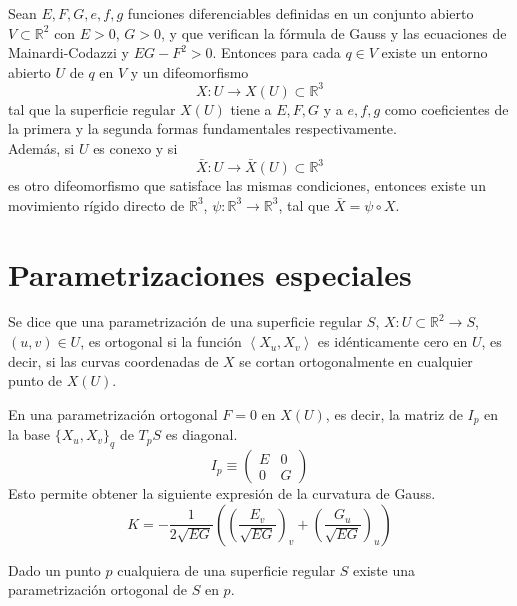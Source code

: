 \begin{theorem}
    Sean $E, F, G, e, f, g$ funciones diferenciables definidas en un conjunto abierto $V \subset \mathbb{R}^2$ con $E > 0$, $G > 0$, y que verifican la fórmula de Gauss y las ecuaciones de Mainardi-Codazzi y $EG-F^2 > 0$.
    Entonces para cada $q \in V$ existe un entorno abierto $U$ de $q$ en $V$ y un difeomorfismo
    $$X: U \to X(U) \subset \mathbb{R}^3$$
    tal que la superficie regular $X(U)$ tiene a $E, F, G$ y a $e, f, g$ como coeficientes de la primera y la segunda formas fundamentales respectivamente.\\
    Además, si $U$ es conexo y si
    $$\bar{X}: U \to \bar{X}(U) \subset \mathbb{R}^3$$
    es otro difeomorfismo que satisface las mismas condiciones, entonces existe un movimiento rígido directo de $\mathbb{R}^3$, $\psi: \mathbb{R}^3 \to \mathbb{R}^3$, tal que $\bar{X} = \psi \circ X$.
\end{theorem}

\section{Parametrizaciones especiales}

\begin{definition}
    Se dice que una parametrización de una superficie regular $S$, $X: U \subset \mathbb{R}^2 \to S$, $(u, v) \in U$, es ortogonal si la función $\left\langle X_u, X_v \right\rangle$ es idénticamente cero en $U$, es decir, si las curvas coordenadas de $X$ se cortan ortogonalmente en cualquier punto de $X(U)$.
\end{definition}

\begin{remark}
    En una parametrización ortogonal $F = 0$ en $X(U)$, es decir, la matriz de $I_p$ en la base $\{X_u, X_v\}_q$ de $T_pS$ es diagonal.
    $$I_p \equiv
        \begin{pmatrix}
            E & 0 \\
            0 & G
        \end{pmatrix}$$
    Esto permite obtener la siguiente expresión de la curvatura de Gauss.
    $$K = -\frac{1}{2\sqrt{EG}} \left( \left( \frac{E_v}{\sqrt{EG}}\right)_v + \left( \frac{G_u}{\sqrt{EG}}\right)_u \right) $$
\end{remark}

\begin{theorem}
    Dado un punto $p$ cualquiera de una superficie regular $S$ existe una parametrización ortogonal de $S$ en $p$.
\end{theorem}

